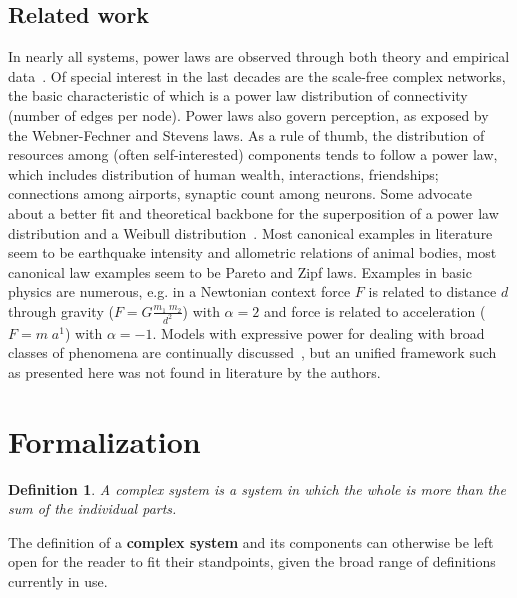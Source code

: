 \documentclass[a4paper, 11pt]{article} %
\newtheorem{definition2}[theorem3]{Definition}
\begin{document}
\subsection{Related work}
In nearly all systems, power laws are observed through both theory and empirical data~\cite{newman}.
Of special interest in the last decades are the scale-free complex networks,
the basic characteristic of which is a power law distribution of connectivity (number of edges per node).
Power laws also govern perception, as exposed by the Webner-Fechner and Stevens laws.
As a rule of thumb, the distribution of resources among (often self-interested) components
tends to follow a power law,
which includes distribution of human wealth, interactions, friendships;
connections among airports, synaptic count among neurons.
Some advocate 
about a better fit and theoretical backbone for the superposition of a
power law distribution and a Weibull distribution~\cite{powWeib}.
Most canonical examples in literature seem to be earthquake intensity and allometric relations of animal bodies,
most canonical law examples seem to be Pareto and Zipf laws.
Examples in basic physics are numerous, e.g. in a Newtonian context force $F$ is related to distance $d$ through gravity
($F=G\frac{m_1\;m_2}{d^2}$)
with $\alpha=2$ 
and force is related to acceleration
($F=m\;a^1$) 
with $\alpha=-1$.
Models with expressive power for dealing with broad classes of phenomena
are continually discussed~\cite{part,pbook}, 
but an unified framework such as presented here 
was not found in literature by the authors.


\section{Formalization}\label{sec:form}

\begin{definition2}
A complex system is a system in which the whole is more
than the sum of the individual parts.
\end{definition2}

The definition of a {\bf complex system} and its components 
can otherwise be left open
for the reader to fit their standpoints,
given the broad range of definitions currently in use.
\end{document}
